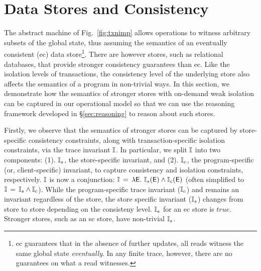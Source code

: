 \section{Data Stores and Consistency}
\label{sec:store-consistency}

The abstract machine of Fig.~\ref{fig:txnimp} allows operations to
witness arbitrary subsets of the global state, thus assuming the
semantics of an eventually consistent ({\sc ec}) data
store\footnote{{\sc ec} guarantees that in the absence of further
updates, all reads witness the same global state \emph{eventually}. In
any finite trace, however, there are no guarantees on what a read
witnesses.}. There are however stores, such as relational databases,
that provide stronger consistency guarantees than {\sc ec}. Like the
isolation levels of transactions, the consistency level of the
underlying store also affects the semantics of a program in
non-trivial ways. In this section, we demonstrate how the semantics of
stronger stores with on-demand weak isolation can be captured in our
operational model so that we can use the reasoning framework developed
in \S\ref{sec:reasoning} to reason about such stores.


Firstly, we observe that the semantics of stronger stores can be
captured by store-specific consistency constraints, along with
transaction-specific isolation constraints, via the trace invariant
$\mathbb{I}$. In particular, we split $\mathbb{I}$ into two components: (1).  $\mathbb{I}_s$,
the store-specific invariant, and (2). $\mathbb{I}_c$, the program-specific
(or, client-specific) invariant, to capture consistency and isolation
constraints, respectively. $\mathbb{I}$ is now a conjunction:
  $\mathbb{I} \,=\, \lambda\textsf{E}.~\mathbb{I}_s(\textsf{E}) \wedge \mathbb{I}_c(\textsf{E})$ (often simplified to
  $\mathbb{I} \,=\, \mathbb{I}_s\wedge\mathbb{I}_c$).
While the program-specific trace invariant ($\mathbb{I}_c$) and remains an
invariant regardless of the store, the store specific invariant
($\mathbb{I}_s$) changes from store to store depending on the consisteny
level. $\mathbb{I}_s$ for an {\sc ec} store is $true$. Stronger stores, such
as an {\sc sc} store, have non-trivial $\mathbb{I}_s$.

